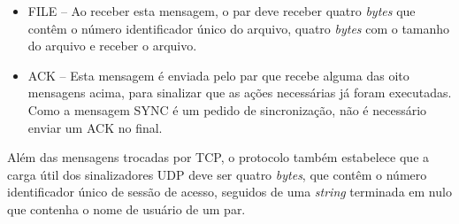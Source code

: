 \documentclass{article}
\begin{document}
\begin{itemize}
	\item FILE -- Ao receber esta mensagem, o par deve receber quatro \textit{bytes} que contêm o número identificador único do arquivo, quatro \textit{bytes} com o tamanho do arquivo e receber o arquivo.
	\item ACK -- Esta mensagem é enviada pelo par que recebe alguma das oito mensagens acima, para sinalizar que as ações necessárias já foram executadas. Como a mensagem SYNC é um pedido de sincronização, não é necessário enviar um ACK no final.
\end{itemize}

Além das mensagens trocadas por TCP, o protocolo também estabelece que a carga útil dos sinalizadores UDP deve ser quatro \textit{bytes}, que contêm o número identificador único de sessão de acesso, seguidos de uma \textit{string} terminada em nulo que contenha o nome de usuário de um par.
\end{document}
